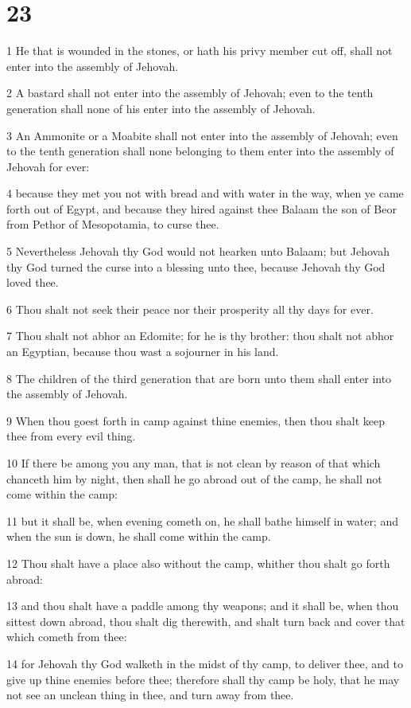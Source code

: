 \chapter{23}

\par 1 He that is wounded in the stones, or hath his privy member cut off, shall not enter into the assembly of Jehovah.
\par 2 A bastard shall not enter into the assembly of Jehovah; even to the tenth generation shall none of his enter into the assembly of Jehovah.
\par 3 An Ammonite or a Moabite shall not enter into the assembly of Jehovah; even to the tenth generation shall none belonging to them enter into the assembly of Jehovah for ever:
\par 4 because they met you not with bread and with water in the way, when ye came forth out of Egypt, and because they hired against thee Balaam the son of Beor from Pethor of Mesopotamia, to curse thee.
\par 5 Nevertheless Jehovah thy God would not hearken unto Balaam; but Jehovah thy God turned the curse into a blessing unto thee, because Jehovah thy God loved thee.
\par 6 Thou shalt not seek their peace nor their prosperity all thy days for ever.
\par 7 Thou shalt not abhor an Edomite; for he is thy brother: thou shalt not abhor an Egyptian, because thou wast a sojourner in his land.
\par 8 The children of the third generation that are born unto them shall enter into the assembly of Jehovah.
\par 9 When thou goest forth in camp against thine enemies, then thou shalt keep thee from every evil thing.
\par 10 If there be among you any man, that is not clean by reason of that which chanceth him by night, then shall he go abroad out of the camp, he shall not come within the camp:
\par 11 but it shall be, when evening cometh on, he shall bathe himself in water; and when the sun is down, he shall come within the camp.
\par 12 Thou shalt have a place also without the camp, whither thou shalt go forth abroad:
\par 13 and thou shalt have a paddle among thy weapons; and it shall be, when thou sittest down abroad, thou shalt dig therewith, and shalt turn back and cover that which cometh from thee:
\par 14 for Jehovah thy God walketh in the midst of thy camp, to deliver thee, and to give up thine enemies before thee; therefore shall thy camp be holy, that he may not see an unclean thing in thee, and turn away from thee.
